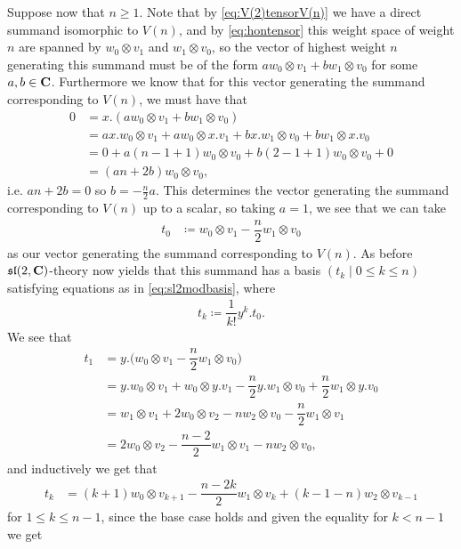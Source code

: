 Suppose now that $n\geq 1$. Note that by \cref{eq:V(2)tensorV(n)} we have a direct summand isomorphic to $V(n)$, and by \cref{eq:hontensor} this weight space of weight $n$ are spanned by $w_0\otimes v_1$ and $w_1\otimes v_0$, so the vector of highest weight $n$ generating this summand must be of the form $aw_0\otimes v_1 + bw_1\otimes v_0$ for some $a,b\in \mathbf{C}$. Furthermore we know that for this vector generating the summand corresponding to $V(n)$, we must have that
\begin{align*}
  0 &= x.(aw_0\otimes v_1 + bw_1\otimes v_0) \\
    &= ax.w_0 \otimes v_1 + aw_0\otimes x.v_1 + bx.w_1\otimes v_0 + bw_1\otimes x.v_0 \\
    &= 0 + a(n-1+1)w_0\otimes v_0 + b(2-1+1)w_0\otimes v_0 + 0 \\
  &= (an+2b)w_0\otimes v_0, 
\end{align*}
i.e. $an+2b=0$ so $b = -\tfrac{n}{2}a$. This determines the vector generating the summand corresponding to $V(n)$ up to a scalar, so taking $a=1$, we see that we can take
\begin{align*}
  t_0 &\coloneqq w_0\otimes v_1 - \dfrac{n}{2}w_1\otimes v_0
\end{align*}
as our vector generating the summand corresponding to $V(n)$. As before $\mathfrak{sl}(2,\mathbf{C})$-theory now yields that this summand has a basis $(t_k \mid 0\leq k\leq n)$ satisfying equations as in \cref{eq:sl2modbasis}, where
\begin{align*}
  t_k \coloneqq \dfrac{1}{k!}y^k.t_0.
\end{align*}
We see that
\begin{align*}
  t_1 &= y.\bigl(w_0\otimes v_1 - \dfrac{n}{2}w_1\otimes v_0\bigr) \\
      &= y.w_0\otimes v_1 + w_0\otimes y.v_1 - \dfrac{n}{2}y.w_1\otimes v_0 + \dfrac{n}{2}w_1\otimes y.v_0 \\
      &= w_1\otimes v_1 + 2w_0\otimes v_2 - nw_2\otimes v_0 - \dfrac{n}{2}w_1\otimes v_1 \\
  &= 2w_0\otimes v_2 -\dfrac{n-2}{2}w_1\otimes v_1 - nw_2\otimes v_0,
\end{align*}
and inductively we get that
\begin{align*}
  t_k &= (k+1)w_0\otimes v_{k+1} - \dfrac{n-2k}{2}w_1\otimes v_k + (k-1-n)w_2\otimes v_{k-1}
\end{align*}
for $1\leq k\leq n-1$, since the base case holds and given the equality for $k<n-1$ we get
